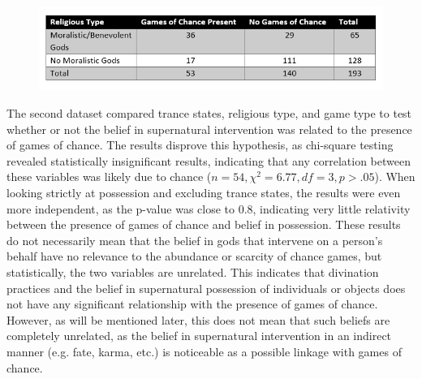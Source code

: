 \documentclass[%
	]{ijsra}
\begin{document}
\begin{figure}[!htb] %
	\includegraphics[width=\linewidth]{figures/Davis-Table02}
	\centering
	\label{fig:Davis-Table02}
\end{figure}

The second dataset compared trance states, religious type, and game type to test whether or not the belief in supernatural intervention was related to the presence of games of chance. The results disprove this hypothesis, as chi-square testing revealed statistically insignificant results, indicating that any correlation between these variables was likely due to chance ($n = 54, \chi^{2} = 6.77, df = 3, p > .05$).  When looking strictly at possession and excluding trance states, the results were even more independent, as the p-value was close to 0.8, indicating very little relativity between the presence of games of chance and belief in possession. These results do not necessarily mean that the belief in gods that intervene on a person’s behalf have no relevance to the abundance or scarcity of chance games, but statistically, the two variables are unrelated. This indicates that divination practices and the belief in supernatural possession of individuals or objects does not have any significant relationship with the presence of games of chance. However, as will be mentioned later, this does not mean that such beliefs are completely unrelated, as the belief in supernatural intervention in an indirect manner (e.g. fate, karma, etc.) is noticeable as a possible linkage with games of chance.
\end{document}
